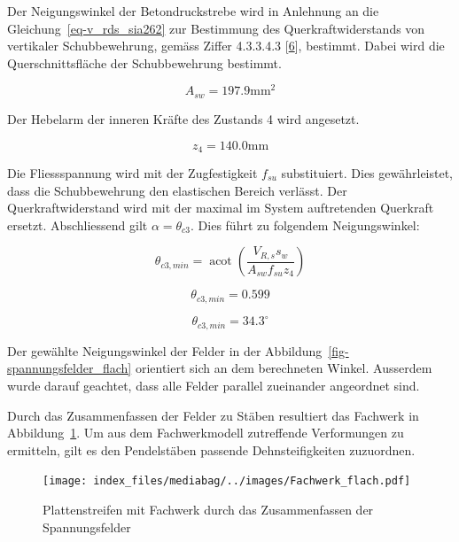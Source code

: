 \documentclass[
  12pt,
  letterpaper,
  egregdoesnotlikesansseriftitles]{scrreprt}
\begin{document}
Der Neigungswinkel der Betondruckstrebe wird in Anlehnung an die
Gleichung~\ref{eq-v_rds_sia262} zur Bestimmung des Querkraftwiderstands
von vertikaler Schubbewehrung, gemäss Ziffer 4.3.3.4.3
{[}\protect\hyperlink{ref-SIA2013a}{6}{]}, bestimmt. Dabei wird die
Querschnittsfläche der Schubbewehrung bestimmt.

\begin{equation}A_{s w} = 197.9 \text{mm}^{2}\end{equation}

Der Hebelarm der inneren Kräfte des Zustands 4 wird angesetzt.

\begin{equation}z_{4} = 140.0 \text{mm}\end{equation}

Die Fliessspannung wird mit der Zugfestigkeit \(f_{su}\) substituiert.
Dies gewährleistet, dass die Schubbewehrung den elastischen Bereich
verlässt. Der Querkraftwiderstand wird mit der maximal im System
auftretenden Querkraft ersetzt. Abschliessend gilt
\(\alpha = \theta_{c3}\). Dies führt zu folgendem Neigungswinkel:

\begin{equation}\theta_{c3,min} = \operatorname{acot}{\left(\frac{V_{R,s} s_{w}}{A_{s w} f_{su} z_{4}} \right)}\end{equation}

\begin{equation}\theta_{c3,min} = 0.599\end{equation}

\begin{equation}\theta_{c3,min} = 34.3 ^\circ\end{equation}

Der gewählte Neigungswinkel der Felder in der
Abbildung~\ref{fig-spannungsfelder_flach} orientiert sich an dem
berechneten Winkel. Ausserdem wurde darauf geachtet, dass alle Felder
parallel zueinander angeordnet sind.

Durch das Zusammenfassen der Felder zu Stäben resultiert das Fachwerk in
Abbildung~\ref{fig-fachwerk_flach}. Um aus dem Fachwerkmodell
zutreffende Verformungen zu ermitteln, gilt es den Pendelstäben passende
Dehnsteifigkeiten zuzuordnen.

\begin{figure}[H]

{\centering \texttt{[image: index\_files/mediabag/../images/Fachwerk\_flach.pdf]}

}

\caption{\label{fig-fachwerk_flach}Plattenstreifen mit Fachwerk durch
das Zusammenfassen der Spannungsfelder}

\end{figure}
\end{document}

